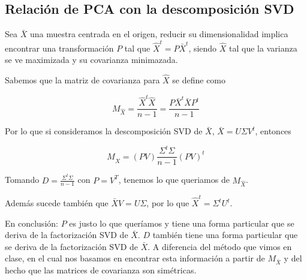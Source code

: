 \subsection{Relación de PCA con la descomposición SVD}

Sea $\bar{X}$ una muestra centrada en el origen, reducir su dimensionalidad implica encontrar una transformación $P$ tal que $\hat{X}^t=P\bar{X}^t$, siendo $\hat{X}$ tal que la varianza se ve maximizada y su covarianza minimazada.

Sabemos que la matriz de covarianza para $\hat{X}$ se define como

\begin{equation*}
    M_{\hat{X}} = \frac{\hat{X}^t\hat{X}}{n-1} = \frac{P\bar{X}^t\bar{X} P^t}{n-1}
\end{equation*}

Por lo que si consideramos la descomposición SVD de $\bar{X}$, $\bar{X}= U \Sigma V^t $, entonces

\begin{equation*}
    M_{\hat{X}} = (PV) \frac{\Sigma^t \Sigma}{n-1} (PV)^t
\end{equation*}

Tomando $D = \frac{\Sigma^t \Sigma}{n-1}$ con $P = V^T$, tenemos lo que queriamos de $M_{\hat{X}}$.

Además sucede también que $\bar{X} V = U \Sigma$, por lo que $\hat{X}^t = \Sigma^t U^t$.

En conclusión: $P$ es justo lo que queríamos y tiene una forma particular que se deriva de la factorización SVD de $\bar{X}$. $D$ también tiene una forma particular que se deriva de la factorización SVD de $\bar{X}$. A diferencia del método que vimos en clase, en el cual nos basamos en encontrar esta información a partir de $M_{\bar{X}}$ y del hecho que las matrices de covarianza son simétricas.



